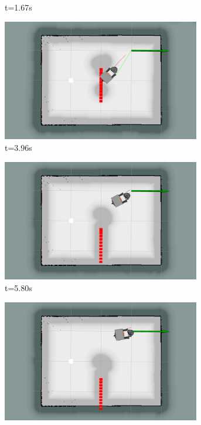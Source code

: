 \begin{figure}[ht]
\begin{subfigure}[b]{0.30\linewidth}
        \caption{t=1.67s}
    \end{subfigure}
    \begin{subfigure}[b]{0.30\linewidth}
        \centering
        \includegraphics[width=0.95\textwidth]{images/dwa_single_1_obs/1/5396.png}
        \caption{t=3.96s}
    \end{subfigure}%
    \begin{subfigure}[b]{0.30\linewidth}
        \centering
        \includegraphics[width=0.95\textwidth]{images/dwa_single_1_obs/1/5580.png}
        \caption{t=5.80s}
    \end{subfigure}%
    \begin{subfigure}[b]{0.30\linewidth}
        \centering
        \includegraphics[width=0.95\textwidth]{images/dwa_single_1_obs/1/5667.png}

\end{subfigure}
\end{figure}
